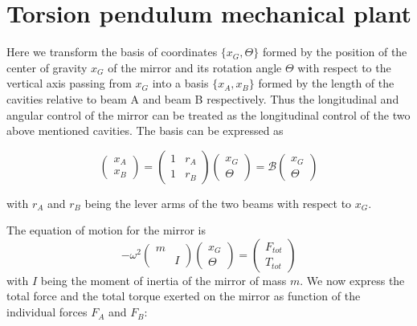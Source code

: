 \section{Torsion pendulum mechanical plant}
\label{app:B} 

Here we transform
the basis of coordinates $\{x_G,\Theta\}$  formed by the position of the center of gravity $x_G$ of the mirror and its rotation angle $\Theta$  with respect to the vertical axis passing from $x_G$ into a basis $\{x_A,x_B\}$ formed by the length of the cavities relative to beam A and beam B respectively. Thus the longitudinal and angular control of the mirror can be treated as the longitudinal control of the two above mentioned cavities. The basis can be expressed as
%

\begin{equation}
\label{eqn:BDEF}
\begin{pmatrix}
x_A \\ x_B
\end{pmatrix}
=
 \begin{pmatrix}
1& r_A\\1& r_B
\end{pmatrix} 
\begin{pmatrix}
x_G\\ \Theta
\end{pmatrix}
=
\mathcal{B}
\begin{pmatrix}
x_G\\ \Theta
\end{pmatrix}
\end{equation}

with $r_A$ and $r_B$ being the lever arms of the two beams with respect to $x_G$.

The equation of motion for the mirror is
\begin{equation}
\label{eqn:motion_matrix}
-\omega^2
\begin{pmatrix}
m &  \\ & I
\end{pmatrix}
 \begin{pmatrix}
x_G\\ \Theta
\end{pmatrix}
= 
\begin{pmatrix}
F_{tot}\\ T_{tot}
\end{pmatrix}
\end{equation}
with $I$ being the moment of inertia of the mirror of mass $m$. We now express the total force and the total torque exerted on the mirror
as function of the individual forces $F_A$ and $F_B$:

